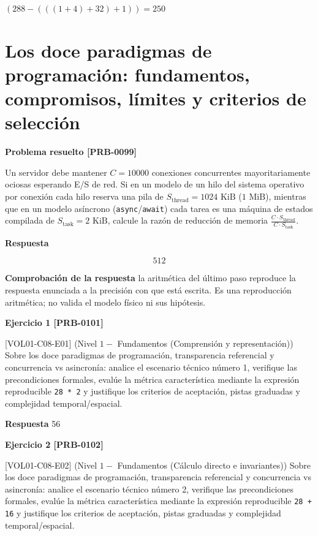 \documentclass{book}
\begin{document}
\(\left(288-\left(\left(\left(1+4\right)+32\right)+1\right)\right) = 250\)

\section{Los doce paradigmas de programación: fundamentos, compromisos, límites y criterios de selección}

\noindent\textbf{Problema resuelto [PRB-0099]}

Un servidor debe mantener \(C = 10000\) conexiones concurrentes mayoritariamente ociosas esperando E/S de red. Si en un modelo de un hilo del sistema operativo por conexión cada hilo reserva una pila de \(S_{\text{thread}} = 1024\text{ KiB}\) (\(1\text{ MiB}\)), mientras que en un modelo asíncrono (\texttt{async}/\texttt{await}) cada tarea es una máquina de estados compilada de \(S_{\text{task}} = 2\text{ KiB}\), calcule la razón de reducción de memoria \(\frac{C \cdot S_{\text{thread}}}{C \cdot S_{\text{task}}}\).

\noindent\textbf{Respuesta}

\[
512
\]

\noindent\textbf{Comprobación de la respuesta} la aritmética del último paso reproduce la respuesta enunciada a la precisión con que está escrita. Es una reproducción aritmética; no valida el modelo físico ni sus hipótesis.

\noindent\textbf{Ejercicio 1 [PRB-0101]}

[VOL01-C08-E01] (Nivel \(1 -\) Fundamentos (Comprensión y representación)) Sobre los doce paradigmas de programación, transparencia referencial y concurrencia vs asincronía: analice el escenario técnico número 1, verifique las precondiciones formales, evalúe la métrica característica mediante la expresión reproducible \texttt{28 * 2} y justifique los criterios de aceptación, pistas graduadas y complejidad temporal/espacial.

\noindent\textbf{Respuesta} 56

\noindent\textbf{Ejercicio 2 [PRB-0102]}

[VOL01-C08-E02] (Nivel \(1 -\) Fundamentos (Cálculo directo e invariantes)) Sobre los doce paradigmas de programación, transparencia referencial y concurrencia vs asincronía: analice el escenario técnico número 2, verifique las precondiciones formales, evalúe la métrica característica mediante la expresión reproducible \texttt{28 + 16} y justifique los criterios de aceptación, pistas graduadas y complejidad temporal/espacial.
\end{document}
